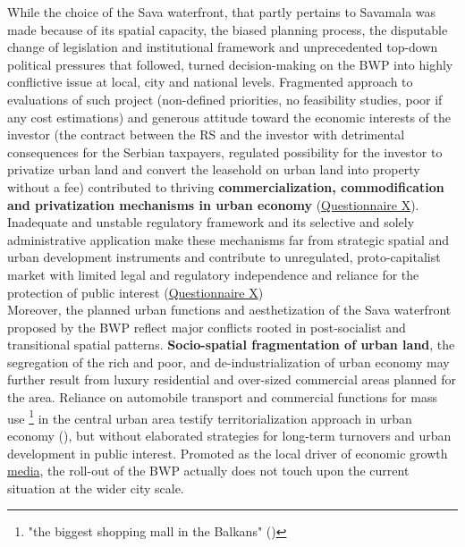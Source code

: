 \documentclass[11pt]{report}
\begin{document}
While the choice of the Sava waterfront, that partly pertains to Savamala was made because of its spatial capacity, the biased planning process, the disputable change of legislation and institutional framework and unprecedented top-down political pressures that followed, turned decision-making on the BWP into highly conflictive issue at local, city and national levels.
Fragmented approach to evaluations of such project (non-defined priorities, no feasibility studies, poor if any cost estimations) and generous attitude toward the economic interests of the investor (the contract between the RS and the investor with detrimental consequences for the Serbian taxpayers, regulated possibility for the investor to privatize urban land and convert the leasehold on urban land into property without a fee) contributed to thriving \textbf{commercialization, commodification and privatization mechanisms in urban economy}
(\href{Questionnaire Experts Savamala}{Questionnaire X}).
Inadequate and unstable regulatory framework and its selective and solely administrative application make these mechanisms far from strategic spatial and urban development instruments and contribute to unregulated, proto-capitalist market with limited legal and regulatory independence and reliance for the protection of public interest
(\href{Questionnaire Experts Savamala}{Questionnaire X})
\\

Moreover, the planned urban functions and aesthetization of the Sava waterfront proposed by the BWP reflect major conflicts rooted in post-socialist and transitional spatial patterns.
\textbf{Socio-spatial fragmentation of urban land}, the segregation of the rich and poor, and de-industrialization of urban economy may further result from luxury residential and over-sized commercial areas planned for the area.
Reliance on automobile transport and commercial functions for mass use
\footnote{"the biggest shopping mall in the Balkans" (\cite{media})}
in the central urban area testify territorialization approach in urban economy (\href{Hirt}{\cite{hirt_belgrade_2009}}), but without elaborated strategies for long-term turnovers and urban development in public interest.
Promoted as the local driver of economic growth \href{}{media}, the roll-out of the BWP actually does not touch upon the current situation at the wider city scale.
\\
\end{document}
